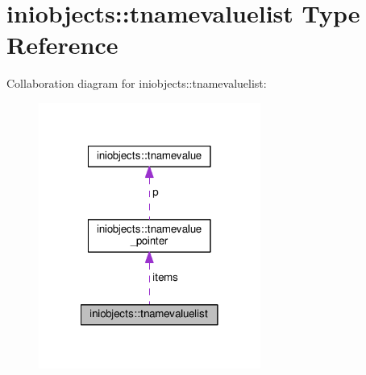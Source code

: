 \hypertarget{structiniobjects_1_1tnamevaluelist}{}\section{iniobjects\+:\+:tnamevaluelist Type Reference}
\label{structiniobjects_1_1tnamevaluelist}


Collaboration diagram for iniobjects\+:\+:tnamevaluelist\+:
\nopagebreak
\begin{figure}[H]
\begin{center}
\leavevmode
\includegraphics[width=206pt]{structiniobjects_1_1tnamevaluelist__coll__graph}
\end{center}
\end{figure}

